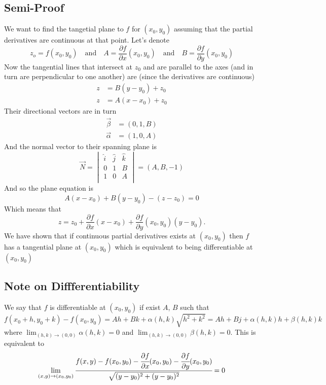 \documentclass[11pt,a4paper]{article}
\begin{document}
	\subsection{Semi-Proof}
	We want to find the tangetial plane to $f$ for $(x_0,y_0)$ 
	assuming that the partial derivatives are continuous at that point. 
	Let's denote
	\[
		z_o=f(x_0,y_0)\quad\mathrm{and}\quad A = 
		\frac{\partial f}{\partial x}(x_0,y_0) \quad
		\mathrm{and} \quad B = \frac{\partial f}{\partial y}(x_0,y_0)
	\]
	Now the tangential lines that intersect at $z_0$ and are parallel 
	to the axes (and in turn are perpendicular to one another) 
	are (since the derivatives are continuous)
	\begin{align*} 
		z &=  B(y-y_0)+z_0 \\ 
		z &=  A(x-x_0)+z_0
	\end{align*}
	Their directional vectors are in turn
	\begin{align*} 
		\vec{\beta} &=  (0,1,B) \\ 
		\vec{\alpha} &=  (1,0,A)
	\end{align*}
	And the normal vector to their spanning plane is
	\[
	\vec{N} = \begin{vmatrix}
		\hat{i} & \hat{j} & \hat{k}\\
		0 & 1 & B\\
		1 & 0 & A\\
	\end{vmatrix}
	 = (A,B,-1)
	\]
	And so the plane equation is
  \[
		A(x-x_0) + B(y-y_0) - (z-z_0) = 0
  \]
  Which means that
  \[
		z =
    z_0 +
    \frac{\partial f}{\partial x}(x - x_0) +
    \frac{\partial f}{\partial y}(x_0,y_0)(y - y_0).
  \]
	We have shown that if continuous partial derivatives exists at $(x_0,y_0)$ 
	then $f$ has a tangential plane at $(x_0,y_0)$ which is equivalent to 
	being differentiable at $(x_0,y_0)$
	
	\subsection{Note on Diffferentiability}
	We say that $f$ is differentiable at $(x_0,y_0)$ if exist $A$, $B$ such that
	\[
		f(x_0+h,y_0+k)-f(x_0,y_0) 
		= Ah + Bk + \alpha(h,k)\sqrt{h^2+k^2}
		= Ah + Bj + \alpha(h,k)h + \beta(h,k)k
	\]
	where $\lim_{(h,k)\to(0,0)}{\alpha(h,k)}=0$ and 
  $\lim_{(h,k)\to (0,0)}{\beta(h,k)}=0$.
  This is equivalent to
	\[
		\lim_{(x,y)\to(x_0,y_0)}
    \cfrac{f(x,y) - f(x_0,y_0) - 
     \cfrac{\partial f}{\partial x}(x_0,y_0) - \cfrac{\partial f}
    {\partial y}(x_0,y_0)}{\sqrt{(y - y_0)^2 + (y - y_0)^2}} = 0
	\]
\end{document}
